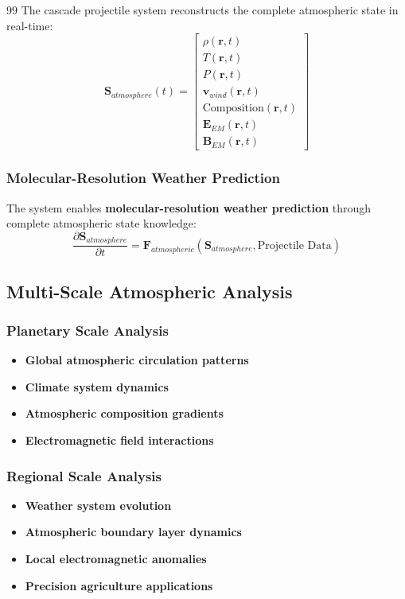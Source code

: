\documentclass[12pt,a4paper]{article}
\begin{document}
\begin{thebibliography}{99}
The cascade projectile system reconstructs the complete atmospheric state in real-time:
\begin{equation}
\mathbf{S}_{atmosphere}(t) = \begin{bmatrix}
\rho(\mathbf{r},t) \\
T(\mathbf{r},t) \\
P(\mathbf{r},t) \\
\mathbf{v}_{wind}(\mathbf{r},t) \\
\text{Composition}(\mathbf{r},t) \\
\mathbf{E}_{EM}(\mathbf{r},t) \\
\mathbf{B}_{EM}(\mathbf{r},t)
\end{bmatrix}
\end{equation}

\subsubsection{Molecular-Resolution Weather Prediction}

The system enables \textbf{molecular-resolution weather prediction} through complete atmospheric state knowledge:
\begin{equation}
\frac{\partial \mathbf{S}_{atmosphere}}{\partial t} = \mathbf{F}_{atmospheric}(\mathbf{S}_{atmosphere}, \text{Projectile Data})
\end{equation}

\subsection{Multi-Scale Atmospheric Analysis}

\subsubsection{Planetary Scale Analysis}
\begin{itemize}
\item \textbf{Global atmospheric circulation patterns}
\item \textbf{Climate system dynamics}  
\item \textbf{Atmospheric composition gradients}
\item \textbf{Electromagnetic field interactions}
\end{itemize}

\subsubsection{Regional Scale Analysis}
\begin{itemize}
\item \textbf{Weather system evolution}
\item \textbf{Atmospheric boundary layer dynamics}
\item \textbf{Local electromagnetic anomalies}
\item \textbf{Precision agriculture applications}
\end{itemize}


\end{thebibliography}
\end{document}
